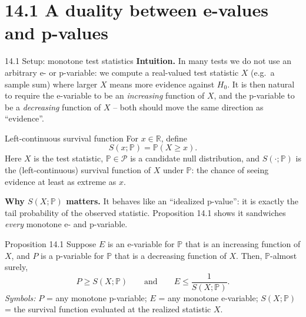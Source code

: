 \documentclass[aspectratio=169,10pt]{beamer}
\newcommand{\PP}{\mathbb{P}}
\newcommand{\RR}{\mathbb{R}}
\newcommand{\calP}{\mathcal{P}}
\begin{document}
\section{14.1 A duality between e-values and p-values}

\begin{frame}[allowframebreaks]{14.1 Setup: monotone test statistics}
  \textbf{Intuition.} In many tests we do not use an arbitrary e- or
  p-variable: we compute a real-valued test statistic $X$ (e.g.\ a sample
  sum) where larger $X$ means more evidence against $H_0$. It is then
  natural to require the e-variable to be an \emph{increasing} function of
  $X$, and the p-variable to be a \emph{decreasing} function of $X$ --
  both should move the same direction as ``evidence''.

  \begin{block}{Left-continuous survival function}
    For $x \in \RR$, define
    \[
      S(x;\PP) = \PP(X \geq x).
    \]
    Here $X$ is the test statistic, $\PP \in \calP$ is a candidate null
    distribution, and $S(\cdot;\PP)$ is the (left-continuous) survival
    function of $X$ under $\PP$: the chance of seeing evidence at least as
    extreme as $x$.
  \end{block}

  \framebreak

  \textbf{Why $S(X;\PP)$ matters.} It behaves like an ``idealized
  p-value'': it is exactly the tail probability of the observed statistic.
  Proposition 14.1 shows it sandwiches \emph{every} monotone e- and
  p-variable.

  \begin{block}{Proposition 14.1}
    Suppose $E$ is an e-variable for $\PP$ that is an increasing function
    of $X$, and $P$ is a p-variable for $\PP$ that is a decreasing
    function of $X$. Then, $\PP$-almost surely,
    \[
      P \geq S(X;\PP) \qquad \text{and} \qquad E \leq \frac{1}{S(X;\PP)}.
    \]
    \emph{Symbols:} $P$ = any monotone p-variable; $E$ = any monotone
    e-variable; $S(X;\PP)$ = the survival function evaluated at the
    realized statistic $X$.
  \end{block}

  \framebreak


\end{frame}
\end{document}
